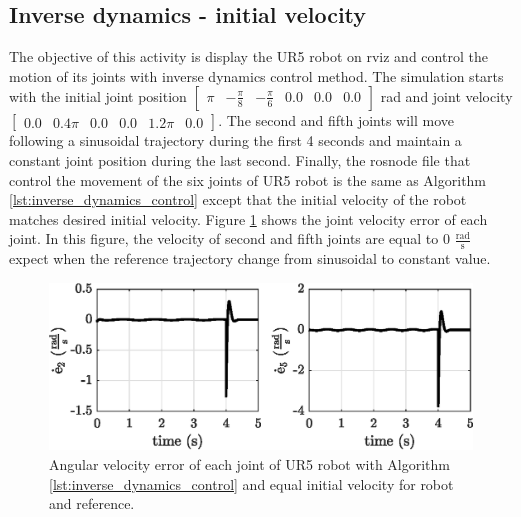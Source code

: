 
\subsection{Inverse dynamics - initial velocity}
The objective of this activity is display the UR5 robot on rviz and control the motion of its joints with inverse dynamics control method. The simulation starts with the initial joint position $\begin{bmatrix} \pi & -\frac{\pi}{8} & -\frac{\pi}{6} & 0.0 & 0.0 & 0.0 \end{bmatrix}$ rad and joint velocity $\begin{bmatrix} 0.0 & 0.4\pi & 0.0 & 0.0 & 1.2\pi & 0.0 \end{bmatrix}$. The second and fifth joints will move following a sinusoidal trajectory during the first 4 seconds and maintain a constant joint position during the last second. Finally, the rosnode file that control the movement of the six joints of UR5 robot is the same as Algorithm \ref{lst:inverse_dynamics_control} except that the initial velocity of the robot matches desired initial velocity. Figure  \ref{fig:act_2.2_de} shows the joint velocity error of each joint. In this figure, the velocity of second and fifth joints are equal to $0$ $\mathrm{\frac{rad}{s}}$ expect when the reference trajectory change from sinusoidal to constant value. 
\vspace{20px}

\begin{figure}[H]
    \centering
    \includegraphics{images/act_2.2/de.eps}
    \caption{Angular velocity error of each joint of UR5 robot with Algorithm \ref{lst:inverse_dynamics_control} and equal initial velocity for robot and reference.}
    \label{fig:act_2.2_de}
\end{figure}